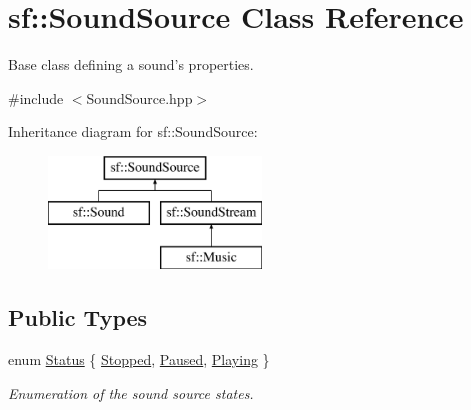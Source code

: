 \hypertarget{classsf_1_1SoundSource}{\section{sf\-:\-:Sound\-Source Class Reference}
\label{classsf_1_1SoundSource}
}


Base class defining a sound's properties.  




{\ttfamily \#include $<$Sound\-Source.\-hpp$>$}

Inheritance diagram for sf\-:\-:Sound\-Source\-:\begin{figure}[H]
\begin{center}
\leavevmode
\includegraphics[height=3.000000cm]{classsf_1_1SoundSource}
\end{center}
\end{figure}
\subsection*{Public Types}
\begin{DoxyCompactItemize}
\item 
enum \hyperlink{classsf_1_1SoundSource_ac43af72c98c077500b239bc75b812f03}{Status} \{ \hyperlink{classsf_1_1SoundSource_ac43af72c98c077500b239bc75b812f03adabb01e8aa85b2f54b344890addf764a}{Stopped}, 
\hyperlink{classsf_1_1SoundSource_ac43af72c98c077500b239bc75b812f03ac3ca1fcc0394267c9bdbe3dc0a8a7e41}{Paused}, 
\hyperlink{classsf_1_1SoundSource_ac43af72c98c077500b239bc75b812f03af07bdea9f70ef7606dfc9f955beeee18}{Playing}
 \}
\begin{DoxyCompactList}\small\item\em Enumeration of the sound source states. \end{DoxyCompactList}\end{DoxyCompactItemize}
